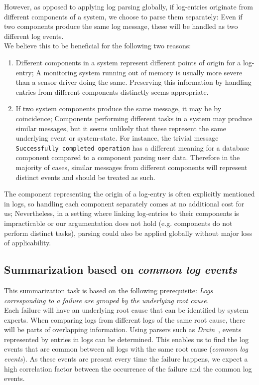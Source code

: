 However, as opposed to applying log parsing globally, if log-entries originate from different components of a system,
we choose to parse them separately:
Even if two components produce the same log message, these will be handled as two different log events.\\
We believe this to be beneficial for the following two reasons:
\begin{enumerate}
\item Different components in a system represent different points of origin for a log-entry;
      A monitoring system running out of memory is usually more severe than a sensor driver doing the same.
      Preserving this information by handling entries from different components distinctly seems appropriate.
\item If two system components produce the same message, it may be by coincidence;
      Components performing different tasks in a system may produce similar messages,
      but it seems unlikely that these represent the same underlying event or system-state.
      For instance, the trivial message \verb+Successfully completed operation+ has a different meaning for a database component compared to a component parsing user data.
      Therefore in the majority of cases, similar messages from different components will represent
      distinct events and should be treated as such.
\end{enumerate}
The component representing the origin of a log-entry is often explicitly mentioned in logs,
so handling each component separately comes at no additional cost for us;
Nevertheless, in a setting where linking log-entries to their components is impracticable
or our argumentation does not hold (e.g. components do not perform distinct tasks),
parsing could also be applied globally without major loss of applicability.

\subsection{Summarization based on \emph{common log events}}\label{subsec:common_log_events_summarization}

This summarization task is based on the following prerequisite:
\emph{Logs corresponding to a failure are grouped by the underlying root cause.}\\
Each failure will have an underlying root cause that can be identified by system experts.
When comparing logs from different logs of the same root cause,
there will be parts of overlapping information.
Using parsers such as \emph{Drain}~\parencite{drain}, events represented by entries in logs can be determined.
This enables us to find the log events that are common between all logs with the same root cause (\emph{common log events}).
As these events are present every time the failure happens,
we expect a high correlation factor between the occurrence of the failure and the common log events.

